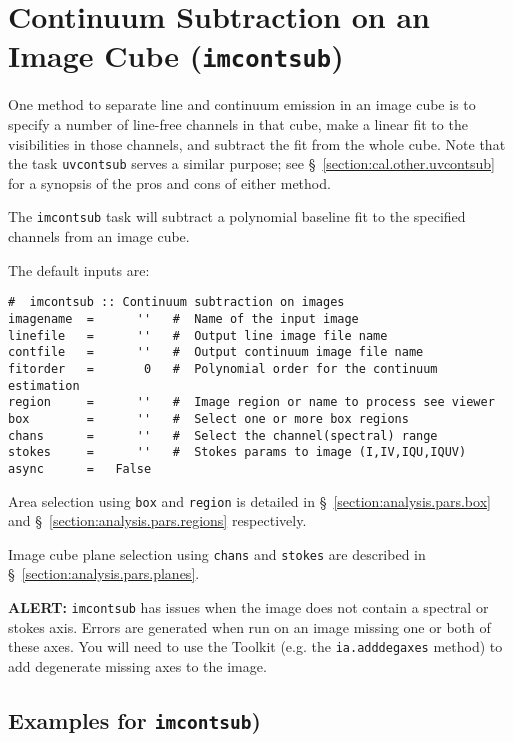 \section{Continuum Subtraction on an Image Cube ({\tt imcontsub})}
\label{section:analysis.imcontsub}

One method to separate line and continuum emission in an image cube is
to specify a number of line-free channels in that cube, make a linear
fit to the visibilities in those channels, and subtract the fit from
the whole cube.  Note that the task {\tt uvcontsub} serves a similar
purpose; see \S~\ref{section:cal.other.uvcontsub} for a synopsis of
the pros and cons of either method.

The {\tt imcontsub} task will subtract a polynomial baseline fit to the
specified channels from an image cube.

The default inputs are: 
\small
\begin{verbatim}
#  imcontsub :: Continuum subtraction on images
imagename  =      ''   #  Name of the input image
linefile   =      ''   #  Output line image file name
contfile   =      ''   #  Output continuum image file name
fitorder   =       0   #  Polynomial order for the continuum estimation
region     =      ''   #  Image region or name to process see viewer
box        =      ''   #  Select one or more box regions
chans      =      ''   #  Select the channel(spectral) range
stokes     =      ''   #  Stokes params to image (I,IV,IQU,IQUV)
async      =   False   
\end{verbatim}
\normalsize

Area selection using {\tt box} and {\tt region} is detailed in 
\S~\ref{section:analysis.pars.box} and
\S~\ref{section:analysis.pars.regions} respectively.

Image cube plane selection using {\tt chans} and {\tt stokes}
are described in \S~\ref{section:analysis.pars.planes}.

{\bf ALERT:} {\tt imcontsub} has issues when the image does
not contain a spectral or stokes axis. Errors are generated when
run on an image missing one or both of these axes.  You will need
to use the Toolkit (e.g. the {\tt ia.adddegaxes} method) to add
degenerate missing axes to the image.

\subsection{Examples for {\tt imcontsub})}
\label{section:analysis.imcontsub.examples}

